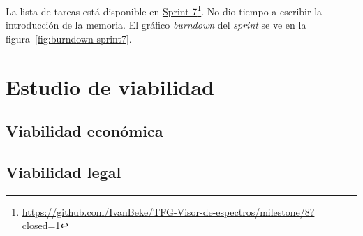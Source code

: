 La lista de tareas está disponible en
\href{https://github.com/IvanBeke/TFG-Visor-de-espectros/milestone/8?closed=1}{Sprint
	7}\footnote{\url{https://github.com/IvanBeke/TFG-Visor-de-espectros/milestone/8?closed=1}}.
No dio tiempo a escribir la introducción de la memoria. El gráfico
\textit{burndown} del \textit{sprint} se ve en la
figura~\ref{fig:burndown-sprint7}.\\


\section{Estudio de viabilidad}

\subsection{Viabilidad económica}

\subsection{Viabilidad legal}



